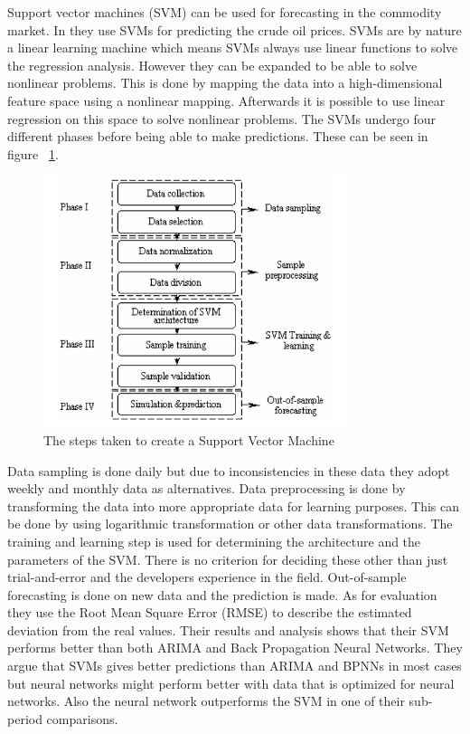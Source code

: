 Support vector machines (SVM) can be used for forecasting in the commodity market. In \cite{xie2006new} they use SVMs for predicting the crude oil prices. SVMs are by nature a linear learning machine which means SVMs always use linear functions to solve the regression analysis. However they can be expanded to be able to solve nonlinear problems. This is done by mapping the data into a high-dimensional feature space using a nonlinear mapping. Afterwards it is possible to use linear regression on this space to solve nonlinear problems. The SVMs undergo four different phases before being able to make predictions. These can be seen in figure ~\ref{fig:phasesOfSVM}.
\begin{figure}[weight!]
\centering
\includegraphics[width=0.8\textwidth ,natwidth=410,natheight=237]{billeder/phases_of_SVM.png}
\caption{The steps taken to create a Support Vector Machine}
\label{fig:phasesOfSVM}
\end{figure}
Data sampling is done daily but due to inconsistencies in these data they adopt weekly and monthly data as alternatives. Data preprocessing is done by transforming the data into more appropriate data for learning purposes. This can be done by using logarithmic transformation or other data transformations. The training and learning step is used for determining the architecture and the parameters of the SVM. There is no criterion for deciding these other than just trial-and-error and the developers experience in the field. Out-of-sample forecasting is done on new data and the prediction is made. As for evaluation they use the Root Mean Square Error (RMSE) to describe the estimated deviation from the real values. Their results and analysis shows that their SVM performs better than both ARIMA and Back Propagation Neural Networks. They argue that SVMs gives better predictions than ARIMA and BPNNs in most cases but neural networks might perform better with data that is optimized for neural networks. Also the neural network outperforms the SVM in one of their sub-period comparisons.

